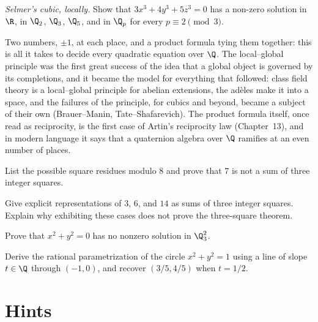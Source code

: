\begin{exercise}[$\star\star\star$]\label{ex:selmer}
\emph{Selmer's cubic, locally.} Show that $3x^3+4y^3+5z^3=0$ has a non-zero solution in $\R$, in $\Q_2$, $\Q_3$, $\Q_5$, and in $\Q_p$
for every $p\equiv2\pmod3$.
\end{exercise}

\begin{beauty}
Two numbers, $\pm1$, at each place, and a product formula tying them together: this is all it takes to decide every quadratic
equation over $\Q$. The local--global principle was the first great success of the idea that a global object is governed by
its completions, and it became the model for everything that followed: class field theory is a local--global principle for
abelian extensions, the ad\`eles make it into a space, and the failures of the principle, for cubics and beyond, became a
subject of their own (Brauer--Manin, Tate--Shafarevich). The product formula itself, once read as reciprocity, is the first
case of Artin's reciprocity law (Chapter~13), and in modern language it says that a quaternion algebra over $\Q$ ramifies at an
even number of places.
\end{beauty}

\begin{exercise}[$\star$]\label{ex:v13-extra-10-1}
List the possible square residues modulo $8$ and prove that $7$ is not a sum of three integer squares.
\end{exercise}

\begin{exercise}[$\star$]\label{ex:v13-extra-10-2}
Give explicit representations of $3$, $6$, and $14$ as sums of three integer squares. Explain why exhibiting these cases does not prove the three-square theorem.
\end{exercise}

\begin{exercise}[$\star\star$]\label{ex:v13-extra-10-3}
Prove that $x^2+y^2=0$ has no nonzero solution in $\Q_3^2$.
\end{exercise}

\begin{exercise}[$\star\star\star$]\label{ex:v13-extra-10-4}
Derive the rational parametrization of the circle $x^2+y^2=1$ using a line of slope $t\in\Q$ through $(-1,0)$, and recover $(3/5,4/5)$ when $t=1/2$.
\end{exercise}

\section{Hints}


